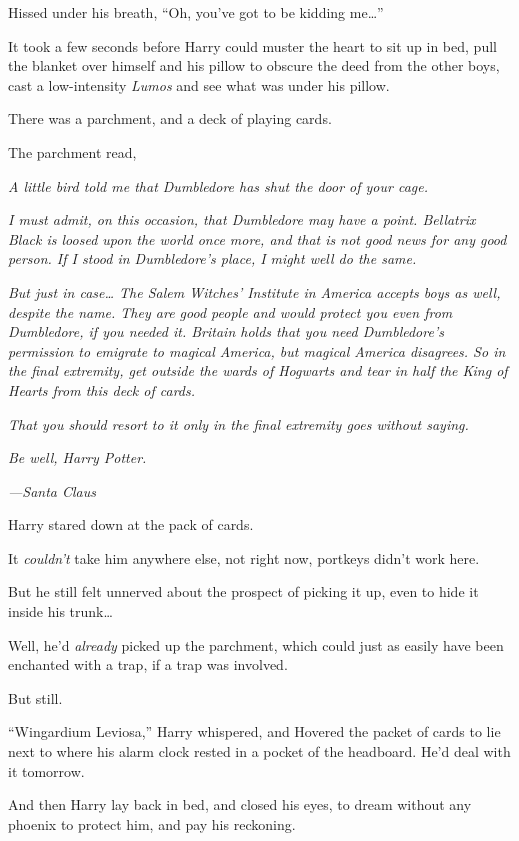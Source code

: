 Hissed under his breath, ``Oh, you've got to be kidding me\ldots{}''

It took a few seconds before Harry could muster the heart to sit up in
bed, pull the blanket over himself and his pillow to obscure the deed
from the other boys, cast a low-intensity \emph{Lumos} and see what was
under his pillow.

There was a parchment, and a deck of playing cards.

The parchment read,

\emph{A little bird told me that Dumbledore has shut the door of your
cage.}

\emph{I must admit, on this occasion, that Dumbledore may have a point.
Bellatrix Black is loosed upon the world once more, and that is not good
news for any good person. If I stood in Dumbledore's place, I might well
do the same.}

\emph{But just in case\ldots{} The Salem Witches' Institute in America
accepts boys as well, despite the name. They are good people and would
protect you even from Dumbledore, if you needed it. Britain holds that
you need Dumbledore's permission to emigrate to magical America, but
magical America disagrees. So in the final extremity, get outside the
wards of Hogwarts and tear in half the King of Hearts from this deck of
cards.}

\emph{That you should resort to it only in the final extremity goes
without saying.}

\emph{Be well, Harry Potter.}

\emph{---Santa Claus}

Harry stared down at the pack of cards.

It \emph{couldn't} take him anywhere else, not right now, portkeys
didn't work here.

But he still felt unnerved about the prospect of picking it up, even to
hide it inside his trunk\ldots{}

Well, he'd \emph{already} picked up the parchment, which could just as
easily have been enchanted with a trap, if a trap was involved.

But still.

``Wingardium Leviosa,'' Harry whispered, and Hovered the packet of cards
to lie next to where his alarm clock rested in a pocket of the
headboard. He'd deal with it tomorrow.

And then Harry lay back in bed, and closed his eyes, to dream without
any phoenix to protect him, and pay his reckoning.

